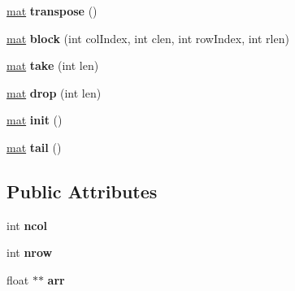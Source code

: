 \begin{DoxyCompactItemize}
\item 
\mbox{\label{class_matrix_vector_1_1mat_abe8ff1f6f29fe9e406b755c3f655dd18}} 
\mbox{\hyperlink{class_matrix_vector_1_1mat}{mat}} {\bfseries transpose} ()
\item 
\mbox{\label{class_matrix_vector_1_1mat_aa623e369c2af8582646a44d0c7614db0}} 
\mbox{\hyperlink{class_matrix_vector_1_1mat}{mat}} {\bfseries block} (int col\+Index, int clen, int row\+Index, int rlen)
\item 
\mbox{\label{class_matrix_vector_1_1mat_a24f0cefca0d6f79545c2f130fda0b82c}} 
\mbox{\hyperlink{class_matrix_vector_1_1mat}{mat}} {\bfseries take} (int len)
\item 
\mbox{\label{class_matrix_vector_1_1mat_a7cd7e57bf6907ee80445afdb462fd095}} 
\mbox{\hyperlink{class_matrix_vector_1_1mat}{mat}} {\bfseries drop} (int len)
\item 
\mbox{\label{class_matrix_vector_1_1mat_a96ad31de366c370206569f0be9e1de5e}} 
\mbox{\hyperlink{class_matrix_vector_1_1mat}{mat}} {\bfseries init} ()
\item 
\mbox{\label{class_matrix_vector_1_1mat_a81893c6dae060972bce5ff67c7a07ee9}} 
\mbox{\hyperlink{class_matrix_vector_1_1mat}{mat}} {\bfseries tail} ()
\end{DoxyCompactItemize}
\subsection*{Public Attributes}
\begin{DoxyCompactItemize}
\item 
\mbox{\label{class_matrix_vector_1_1mat_a592d970921c2d031bf648d70e5f448dc}} 
int {\bfseries ncol}
\item 
\mbox{\label{class_matrix_vector_1_1mat_af448f5d4ef6da3b9c6d72870f690695d}} 
int {\bfseries nrow}
\item 
\mbox{\label{class_matrix_vector_1_1mat_a5f1dd191eaa81d863fd0c2a546cf7e67}} 
float $\ast$$\ast$ {\bfseries arr}
\end{DoxyCompactItemize}


